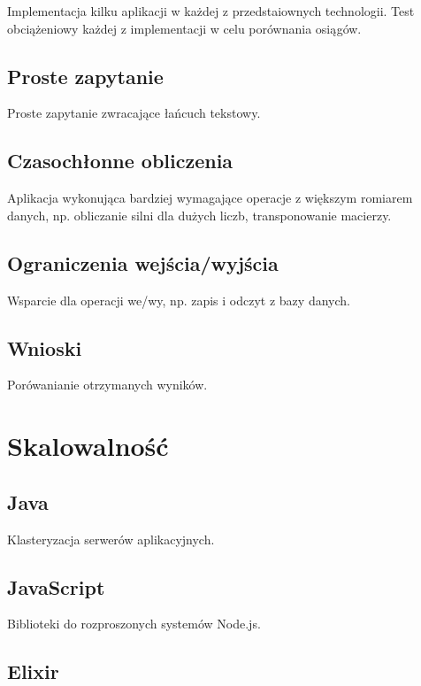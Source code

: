 Implementacja kilku aplikacji w każdej z przedstaiownych technologii.
Test obciążeniowy każdej z implementacji w celu porównania osiągów.

\subsection{Proste zapytanie}

Proste zapytanie zwracające łańcuch tekstowy.

\subsection{Czasochłonne obliczenia}

Aplikacja wykonująca bardziej wymagające operacje z większym romiarem
danych, np. obliczanie silni dla dużych liczb, transponowanie macierzy.

\subsection{Ograniczenia
wejścia/wyjścia}

Wsparcie dla operacji we/wy, np. zapis i odczyt z bazy danych.

\subsection{Wnioski}

Porówanianie otrzymanych wyników.

\section{Skalowalność}

\subsection{Java}

Klasteryzacja serwerów aplikacyjnych.

\subsection{JavaScript}

Biblioteki do rozproszonych systemów Node.js.

\subsection{Elixir}

